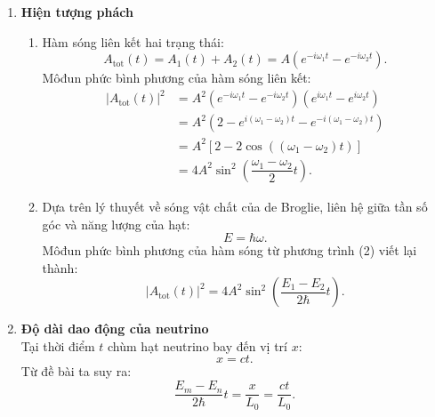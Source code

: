 \begin{enumerate} 
    \item  \textbf{Hiện tượng phách}\\
    \begin{enumerate}
        \item Hàm sóng liên kết hai trạng thái:
        \begin{equation} \label{eq1_neutrino_oscillation}
            A_{\text{tot}}(t)=A_1(t)+A_2(t)=A\left(e^{-i\omega_1 t}-e^{-i\omega_2 t}\right).
        \end{equation}
        Môđun phức bình phương của hàm sóng liên kết:
        \begin{equation} \label{eq2_neutrino_oscillation}
        \begin{split}
            |A_{\text{tot}}(t)|^2&=A^2\left(e^{-i\omega_1 t}-e^{-i\omega_2 t}\right)\left(e^{i\omega_1 t}-e^{i\omega_2 t}\right) \\ 
            &= A^2\left(2-e^{i(\omega_1-\omega_2) t}-e^{-i(\omega_1-\omega_2) t}\right) \\ 
            &=A^2\left[2-2\cos\left((\omega_1-\omega_2) t\right)\right] \\ 
            &=4A^2 \sin^2 \left(\dfrac{\omega_1-\omega_2}{2}t\right).
        \end{split}   
        \end{equation}
    \item Dựa trên lý thuyết về sóng vật chất của de Broglie, liên hệ giữa tần số góc và năng lượng của hạt:
    \begin{equation} \label{eq3_neutrino_oscillation}
        E=\hbar \omega .
    \end{equation}
    Môđun phức bình phương của hàm sóng từ phương trình (2) viết lại thành:
    \begin{equation} \label{eq4_neutrino_oscillation}
        |A_{\text{tot}}(t)|^2 =4A^2 \sin^2 \left(\dfrac{E_1-E_2}{2\hbar}t\right).
    \end{equation}
    \end{enumerate}
    \item \textbf{Độ dài dao động của neutrino}\\
Tại thời điểm $t$ chùm hạt neutrino bay đến vị trí $x$:
\begin{equation} \label{eq5_neutrino_oscillation}
    x=ct.
\end{equation}
Từ đề bài ta suy ra:
\begin{equation} \label{eq6_neutrino_oscillation}
    \dfrac{E_m-E_n}{2\hbar}t=\dfrac{x}{L_0}=\dfrac{ct}{L_0}.

\end{equation}
\end{enumerate}
